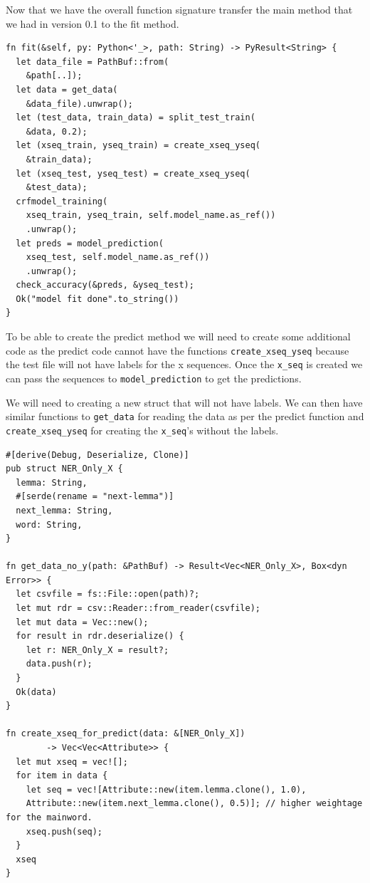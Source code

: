 \documentclass{book}
\begin{document}
Now that we have the overall function signature transfer the main method that we had in version 0.1 to the fit method.

\begin{lstlisting}[caption={chapter8/crfsuite-model/src/lib.rs}, basicstyle=\small]
fn fit(&self, py: Python<'_>, path: String) -> PyResult<String> {
  let data_file = PathBuf::from(
  	&path[..]);
  let data = get_data(
  	&data_file).unwrap();
  let (test_data, train_data) = split_test_train(
  	&data, 0.2);
  let (xseq_train, yseq_train) = create_xseq_yseq(
  	&train_data);
  let (xseq_test, yseq_test) = create_xseq_yseq(
  	&test_data);
  crfmodel_training(
  	xseq_train, yseq_train, self.model_name.as_ref())
	.unwrap();
  let preds = model_prediction(
  	xseq_test, self.model_name.as_ref())
	.unwrap();
  check_accuracy(&preds, &yseq_test);
  Ok("model fit done".to_string())
}
\end{lstlisting}

To be able to create the predict method we will need to create some additional code as the predict code cannot have the functions \lstinline{create_xseq_yseq} because the test file will not have labels for the x sequences. Once the \lstinline{x_seq} is created we can pass the sequences to \lstinline{model_prediction} to get the predictions.

We will need to creating a new struct that will not have labels. We can then have similar functions to \lstinline{get_data} for reading the data as per the predict function and \lstinline{create_xseq_yseq} for creating the \lstinline{x_seq}'s without the labels.

\begin{lstlisting}[caption={chapter8/crfsuite-model/src/lib.rs}, basicstyle=\small]
#[derive(Debug, Deserialize, Clone)]
pub struct NER_Only_X {
  lemma: String,
  #[serde(rename = "next-lemma")]
  next_lemma: String,
  word: String,
}

fn get_data_no_y(path: &PathBuf) -> Result<Vec<NER_Only_X>, Box<dyn Error>> {
  let csvfile = fs::File::open(path)?;
  let mut rdr = csv::Reader::from_reader(csvfile);
  let mut data = Vec::new();
  for result in rdr.deserialize() {
    let r: NER_Only_X = result?;
    data.push(r);
  }
  Ok(data)
}

fn create_xseq_for_predict(data: &[NER_Only_X])
        -> Vec<Vec<Attribute>> {
  let mut xseq = vec![];
  for item in data {
    let seq = vec![Attribute::new(item.lemma.clone(), 1.0),
    Attribute::new(item.next_lemma.clone(), 0.5)]; // higher weightage for the mainword.
    xseq.push(seq);
  }
  xseq
}
\end{lstlisting}
\end{document}
